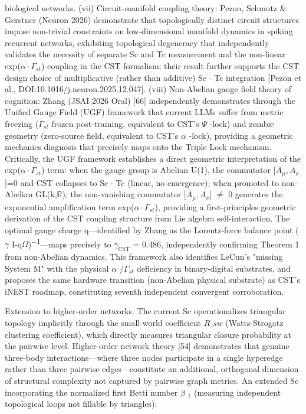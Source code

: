 \documentclass[a4paper,12pt]{article}
\providecommand{\textsubscript}[1]{\ensuremath{_{\text{#1}}}}
\begin{document}
biological networks. (vii) Circuit-manifold coupling theory: Pezon, Schmutz & Gerstner (Neuron 2026) demonstrate that topologically distinct circuit structures impose non-trivial constraints on low-dimensional manifold dynamics in spiking recurrent networks, exhibiting topological degeneracy that independently validates the necessity of separate Sc and Tc measurement and the non-linear
exp($\alpha \cdot \Gamma_{st}$) coupling in the CST formalism; their result further supports the CST design choice of multiplicative (rather than additive) Sc $\cdot$ Tc integration [Pezon et al., DOI:10.1016/j.neuron.2025.12.047]. (viii) Non-Abelian gauge field theory of cognition: Zhang (JSAI 2026 Oral) [66] independently demonstrates through the Unified Gauge Field (UGF) framework that current
LLMs suffer from metric freezing ($\Gamma_{st}$ frozen post-training, equivalent to CST's  $\Psi$ -lock) and zombie geometry (zero-source field, equivalent to CST's  $\alpha$ -lock), providing a geometric mechanics diagnosis that precisely maps onto the Triple Lock mechanism.
Critically, the UGF framework establishes a direct geometric interpretation of the exp($\alpha \cdot \Gamma_{st}$) term: when the gauge group is Abelian U(1), the commutator [$A_{\mu}, A_{\nu}$]=0 and CST collapses to Sc $\cdot$ Tc (linear, no emergence); when promoted to non-Abelian GL(k,$\mathbb{R}$), the non-vanishing commutator [$A_{\mu}, A_{\nu}$] $\neq$ 0 generates the exponential amplification term
exp($\alpha \cdot \Gamma_{st}$), providing a first-principles geometric derivation of the CST coupling structure from Lie algebra self-interaction.
The optimal gauge charge q---identified by Zhang as the Lorentz-force balance point ( $\gamma$ I-q$\Omega$)\textsuperscript{$-$}\textsuperscript{1}---maps precisely to $\gamma_{\text{CST}}$ = 0.486, independently confirming Theorem 1 from non-Abelian dynamics.
This framework also identifies LeCun's "missing System M" with the physical  $\alpha$ /$\Gamma_{st}$ deficiency in binary-digital substrates, and proposes the same hardware transition (non-Abelian physical substrate) as CST's iNEST roadmap, constituting seventh independent convergent corroboration.

Extension to higher-order networks.
The current Sc operationalizes triangular topology implicitly through the small-world coefficient $R\_{sw}$ (Watts-Strogatz clustering coefficient), which directly measures triangular closure probability at the pairwise level.
Higher-order network theory [54] demonstrates that genuine three-body interactions---where three nodes participate in a single hyperedge rather than three pairwise edges---constitute an additional, orthogonal dimension of structural complexity not captured by pairwise graph metrics.
An extended Sc incorporating the normalized first Betti number  $\beta$ \textsubscript{1} (measuring independent topological loops not fillable by triangles):
\end{document}
